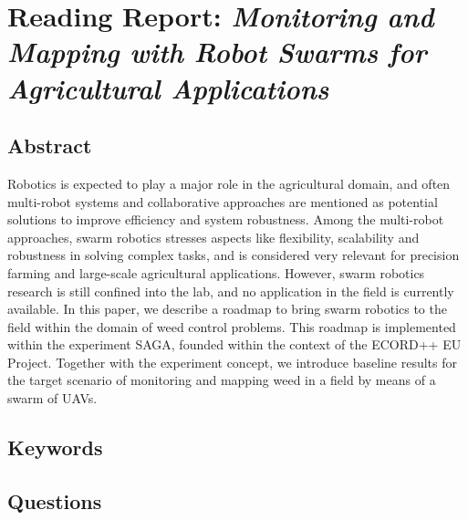 \documentclass{article}
\begin{document}


\section{Reading Report: \emph{Monitoring and Mapping with Robot Swarms for Agricultural Applications}}
\cite{Albani2017}

\subsection*{Abstract}
Robotics is expected to play a major role in the agricultural domain, and often multi-robot systems and collaborative approaches are mentioned as potential solutions
to improve efficiency and system robustness. Among the
multi-robot approaches, swarm robotics stresses aspects
like flexibility, scalability and robustness in solving complex
tasks, and is considered very relevant for precision farming
and large-scale agricultural applications. However, swarm
robotics research is still confined into the lab, and no application in the field is currently available. In this paper,
we describe a roadmap to bring swarm robotics to the field
within the domain of weed control problems. This roadmap
is implemented within the experiment SAGA, founded within
the context of the ECORD++ EU Project. Together with the
experiment concept, we introduce baseline results for the
target scenario of monitoring and mapping weed in a field
by means of a swarm of UAVs.

\subsection*{Keywords}

\subsection*{Questions}
\end{document}
